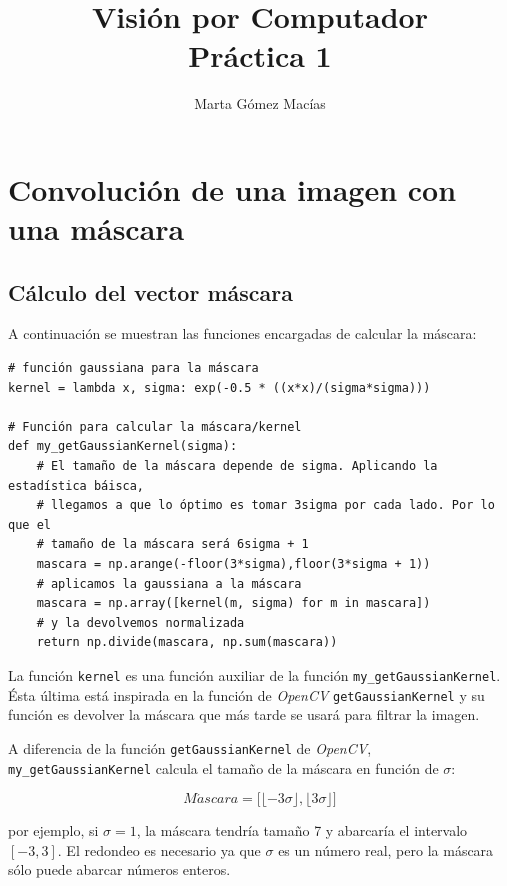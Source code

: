 \documentclass[11pt,a4paper]{article}
\title{\Huge{Visión por Computador} \\ Práctica 1}
\author{Marta Gómez Macías}
\theoremstyle{plain}
\theoremstyle{definition}
\begin{document}
\maketitle

\tableofcontents

\section{Convolución de una imagen con una máscara}
\subsection{Cálculo del vector máscara}

A continuación se muestran las funciones encargadas de calcular la máscara:

\begin{verbatim}
# función gaussiana para la máscara
kernel = lambda x, sigma: exp(-0.5 * ((x*x)/(sigma*sigma)))

# Función para calcular la máscara/kernel
def my_getGaussianKernel(sigma):
    # El tamaño de la máscara depende de sigma. Aplicando la estadística báisca, 
    # llegamos a que lo óptimo es tomar 3sigma por cada lado. Por lo que el 
    # tamaño de la máscara será 6sigma + 1
    mascara = np.arange(-floor(3*sigma),floor(3*sigma + 1))
    # aplicamos la gaussiana a la máscara
    mascara = np.array([kernel(m, sigma) for m in mascara])
    # y la devolvemos normalizada
    return np.divide(mascara, np.sum(mascara))
\end{verbatim}

La función \texttt{kernel} es una función auxiliar de la función \texttt{my\_getGaussianKernel}. Ésta última está inspirada en la función de \textit{OpenCV} \texttt{getGaussianKernel} y su función es devolver la máscara que más tarde se usará para filtrar la imagen.

A diferencia de la función \texttt{getGaussianKernel} de \textit{OpenCV}, \texttt{my\_getGaussianKernel} calcula el tamaño de la máscara en función de $\sigma$:

\begin{displaymath}
 M\acute{a}scara = \bigg[\lfloor-3\sigma\rfloor,\lfloor3\sigma\rfloor\bigg]
\end{displaymath}

por ejemplo, si $\sigma = 1$, la máscara tendría tamaño 7 y abarcaría el intervalo $[-3,3]$. El redondeo es necesario ya que $\sigma$ es un número real, pero la máscara sólo puede abarcar números enteros.
\end{document}
